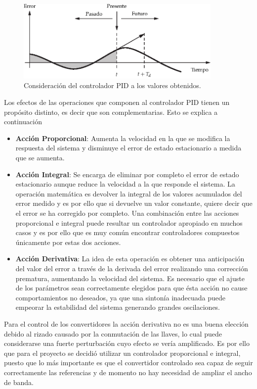 \begin{figure}
 \centering
 \includegraphics[width=10cm]{gfx/accion_PID}
 \caption{Consideración del controlador PID a los valores obtenidos.}
 \label{fig:accion_PID}
\end{figure}

Los efectos de las operaciones que componen al controlador PID tienen un propósito distinto, es decir que son complementarias. Esto se explica a continuación
\begin{itemize}
 \item \textbf{Acción Proporcional}: Aumenta la velocidad en la que se modifica la respuesta del sistema y disminuye el error de estado estacionario a medida
 que se aumenta.
 \item \textbf{Acción Integral}: Se encarga de eliminar por completo el error de estado estacionario aunque reduce la velocidad a la que responde el sistema.
 La operación matemática es devolver la integral de los valores acumulados del error medido y es por ello que si devuelve un valor constante, quiere decir que
 el error se ha corregido por completo. Una combinación entre las acciones proporcional e integral puede resultar un controlador apropiado en muchos casos 
 y es por ello que es muy común encontrar controladores compuestos únicamente por estas dos acciones.
 \item \textbf{Acción Derivativa}: La idea de esta operación es obtener una anticipación del valor del error a través de la derivada del error realizando una
 corrección prematura, aumentando la velocidad del sistema. Es necesario que el ajuste de los parámetros sean correctamente elegidos para que ésta acción no
 cause comportamientos no deseados, ya que una sintonía inadecuada puede empeorar la estabilidad del sistema generando grandes oscilaciones.
\end{itemize}

Para el control de los convertidores la acción derivativa no es una buena elección debido al rizado causado por la conmutación de las llaves,
lo cual puede considerarse una fuerte perturbación cuyo efecto se vería amplificado. Es por ello que para el proyecto se decidió utilizar un controlador
proporcional e integral, puesto que lo más importante es que el convertidor controlado sea capaz de seguir correctamente las referencias y de momento
no hay necesidad de ampliar el ancho de banda.

